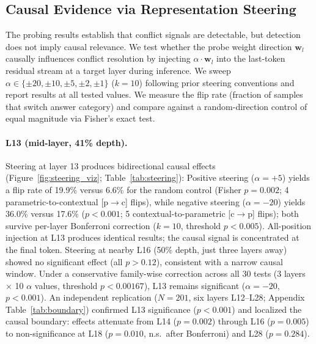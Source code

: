 \subsection{Causal Evidence via Representation Steering}
\label{sec:steering}

The probing results establish that conflict signals are detectable, but detection does not imply causal relevance.
We test whether the probe weight direction $\mathbf{w}_l$ causally influences conflict resolution by injecting $\alpha \cdot \mathbf{w}_l$ into the last-token residual stream at a target layer during inference.
We sweep $\alpha \in \{\pm 20, \pm 10, \pm 5, \pm 2, \pm 1\}$ ($k = 10$) following prior steering conventions \citep{turner2023activation, marks2024geometry} and report results at all tested values.
We measure the flip rate (fraction of samples that switch answer category) and compare against a random-direction control of equal magnitude via Fisher's exact test.

\paragraph{L13 (mid-layer, 41\% depth).}
Steering at layer 13 produces bidirectional causal effects (Figure~\ref{fig:steering_viz}; Table~\ref{tab:steering}):
Positive steering ($\alpha = +5$) yields a flip rate of 19.9\% versus 6.6\% for the random control (Fisher $p = 0.002$; 4 parametric-to-contextual [p$\to$c] flips), while negative steering ($\alpha = -20$) yields 36.0\% versus 17.6\% ($p < 0.001$; 5 contextual-to-parametric [c$\to$p] flips); both survive per-layer Bonferroni correction ($k{=}10$, threshold $p < 0.005$).
All-position injection at L13 produces identical results; the causal signal is concentrated at the final token.
Steering at nearby L16 (50\% depth, just three layers away) showed no significant effect (all $p > 0.12$), consistent with a narrow causal window.
Under a conservative family-wise correction across all 30 tests (3 layers $\times$ 10 $\alpha$ values, threshold $p < 0.00167$), L13 remains significant ($\alpha = -20$, $p < 0.001$).
An independent replication ($N = 201$, six layers L12--L28; Appendix Table~\ref{tab:boundary}) confirmed L13 significance ($p < 0.001$) and localized the causal boundary: effects attenuate from L14 ($p = 0.002$) through L16 ($p = 0.005$) to non-significance at L18 ($p = 0.010$, n.s.\ after Bonferroni) and L28 ($p = 0.284$).

